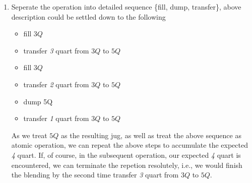 \documentclass[11pt]{article}
\begin{document}
{\begin{enumerate}[1.]
	jug once.
\item
	Seperate the operation into detailed sequence \{fill, dump, transfer\}, above description could be settled down to the following
	\begin{itemize}
	\item fill $3Q$
	\item transfer \emph{3} quart from $3Q$ to $5Q$
	\item fill $3Q$
	\item transfer \emph{2} quart from $3Q$ to $5Q$
	\item dump 5Q
	\item transfer \emph{1} quart from $3Q$ to $5Q$
	\end{itemize}
	As we treat $5Q$ as the resulting jug, as well as treat the above sequence as atomic operation, we can repeat the above steps %
	to accumulate the expected \emph{4} quart. If, of course, in the subsequent operation, our expected \emph{4} quart is encountered, %
	we can terminate the repetion resolutely, i.e., we would finish the blending by the second time transfer \emph{3} quart from $3Q$ to %
	$5Q$.
\end{enumerate}
\par}


\end{document}
